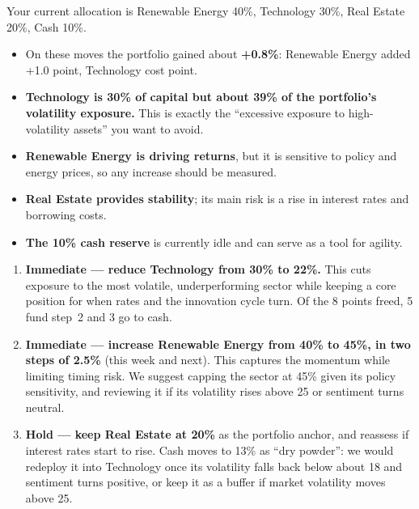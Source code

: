 \documentclass[11pt]{article}
\begin{document}
Your current allocation is Renewable Energy 40\%, Technology 30\%, Real Estate
20\%, Cash 10\%.
\begin{itemize}[leftmargin=1.5em, itemsep=3pt]
  \item On these moves the portfolio gained about \textbf{+0.8\%}: Renewable
  Energy added +1.0 point, Technology cost  point.
  \item \textbf{Technology is 30\% of capital but about 39\% of the
  portfolio's volatility exposure.} This is exactly the ``excessive exposure to
  high-volatility assets'' you want to avoid.
  \item \textbf{Renewable Energy is driving returns}, but it is sensitive to
  policy and energy prices, so any increase should be measured.
  \item \textbf{Real Estate provides stability}; its main risk is a rise in
  interest rates and borrowing costs.
  \item \textbf{The 10\% cash reserve} is currently idle and can serve as a
  tool for agility.
\end{itemize}

\begin{enumerate}[leftmargin=1.5em, itemsep=4pt]
  \item \textbf{Immediate --- reduce Technology from 30\% to 22\%.} This cuts
  exposure to the most volatile, underperforming sector while keeping a core
  position for when rates and the innovation cycle turn. Of the 8 points
  freed, 5 fund step~2 and 3 go to cash.
  \item \textbf{Immediate --- increase Renewable Energy from 40\% to 45\%, in
  two steps of 2.5\%} (this week and next). This captures the momentum while
  limiting timing risk. We suggest capping the sector at 45\% given its policy
  sensitivity, and reviewing it if its volatility rises above 25 or sentiment
  turns neutral.
  \item \textbf{Hold --- keep Real Estate at 20\%} as the portfolio anchor, and
  reassess if interest rates start to rise. Cash moves to 13\% as ``dry
  powder'': we would redeploy it into Technology once its volatility falls
  back below about 18 and sentiment turns positive, or keep it as a buffer if
  market volatility moves above 25.
\end{enumerate}
\end{document}
